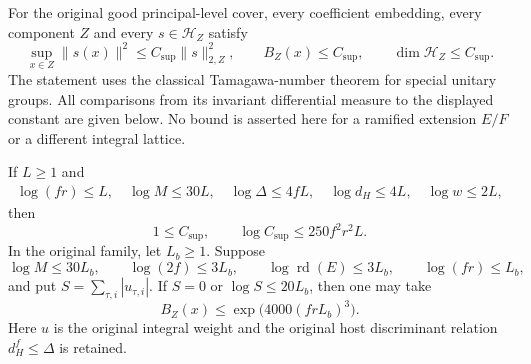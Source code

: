 \begin{theorem}
\label{thm:actual-upper-bergman}
For the original good principal-level cover, every coefficient
embedding, every component $Z$ and every $s\in\mathcal H_Z$ satisfy
\[
 \sup_{x\in Z}\|s(x)\|^2
       \le C_{\mathrm{sup}}\|s\|_{2,Z}^2,
 \qquad B_Z(x)\le C_{\mathrm{sup}},
 \qquad \dim\mathcal H_Z\le C_{\mathrm{sup}}.
\]
The statement uses the classical Tamagawa-number theorem for special
unitary groups.  All comparisons from its invariant differential
measure to the displayed constant are given below.  No bound is
asserted here for a ramified extension $E/F$ or a different integral
lattice.

If $L\ge1$ and
\begin{gather}
 \log(fr)\le L,\quad \log M\le30L,
 \quad \log\Delta\le4fL,\quad
 \log d_H\le4L,\quad \log w\le2L,
 \label{eq:actual-upper-size}
\end{gather}
then
\begin{equation}\label{eq:actual-upper-logbound}
            1\le C_{\mathrm{sup}},\qquad
            \log C_{\mathrm{sup}}\le250f^2r^2L.
\end{equation}
In the original family, let $L_b\ge1$.  Suppose
\[
 \log M\le30L_b,\qquad
 \log(2f)\le3L_b,\qquad \log\operatorname{rd}(E)\le3L_b,\qquad
 \log(fr)\le L_b,
\]
and put $S=\sum_{\tau,i}|u_{\tau,i}|$.  If $S=0$ or
$\log S\le20L_b$, then one may take
\begin{equation}\label{eq:actual-upper-family}
                   B_Z(x)\le \exp\bigl(4000(frL_b)^3\bigr).
\end{equation}
Here $u$ is the original integral weight and the original host
discriminant relation $d_H^f\le\Delta$ is retained.
\end{theorem}

